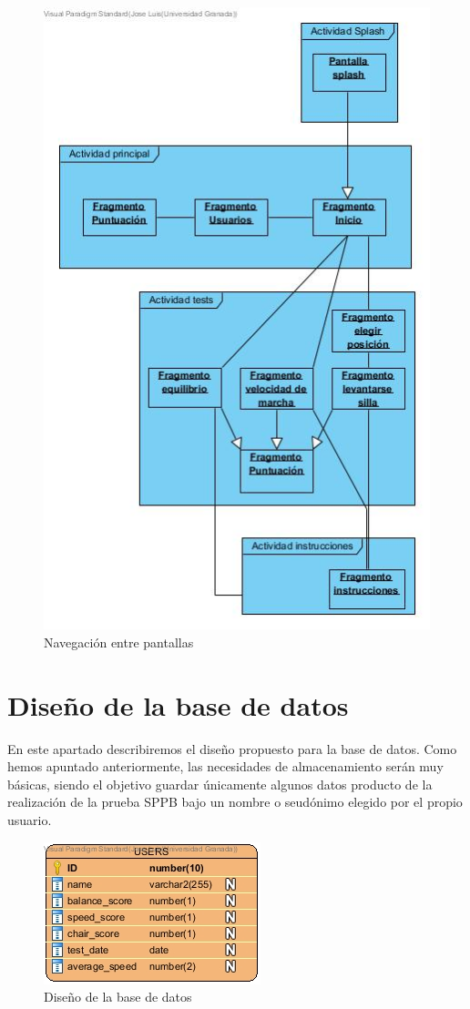 \begin{figure}[H]
	\centering
	\includegraphics[scale=0.70]{imagenes/pantallas.jpg}
	\caption{Navegación entre pantallas\label{fig:navegacion}}
\end{figure}

\section{Diseño de la base de datos}

En este apartado describiremos el diseño propuesto para la base de datos. Como hemos apuntado anteriormente, las necesidades de almacenamiento serán muy básicas, siendo el objetivo guardar únicamente algunos datos producto de la realización de la prueba SPPB bajo un nombre o seudónimo elegido por el propio usuario.

\begin{figure}[H]
	\centering
	\includegraphics[scale=0.70]{imagenes/USERS.jpg}
	\caption{Diseño de la base de datos\label{fig:base_datos}}
\end{figure}

